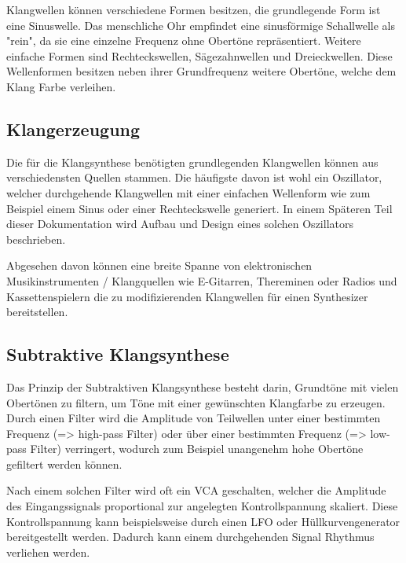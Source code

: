 Klangwellen können verschiedene Formen besitzen, die grundlegende Form ist eine Sinuswelle. Das menschliche Ohr empfindet eine sinusförmige Schallwelle als "rein", da sie eine einzelne Frequenz ohne Obertöne repräsentiert. Weitere einfache Formen sind Rechteckswellen, Sägezahnwellen und Dreieckwellen. Diese Wellenformen besitzen neben ihrer Grundfrequenz weitere Obertöne, welche dem Klang Farbe verleihen.

\subsection{Klangerzeugung}
\label{sec:org03d2400}
Die für die Klangsynthese benötigten grundlegenden Klangwellen können aus verschiedensten Quellen stammen. Die häufigste davon ist wohl ein Oszillator, welcher durchgehende Klangwellen mit einer einfachen Wellenform wie zum Beispiel einem Sinus oder einer Rechteckswelle generiert. In einem Späteren Teil dieser Dokumentation wird Aufbau und Design eines solchen Oszillators beschrieben.

Abgesehen davon können eine breite Spanne von elektronischen Musikinstrumenten / Klangquellen wie E-Gitarren, Thereminen oder Radios und Kassettenspielern die zu modifizierenden Klangwellen für einen Synthesizer bereitstellen.

\subsection{Subtraktive Klangsynthese}
\label{sec:org84d5f29}
Das Prinzip der Subtraktiven Klangsynthese besteht darin, Grundtöne mit vielen Obertönen zu filtern, um Töne mit einer gewünschten Klangfarbe zu erzeugen. Durch einen Filter wird die Amplitude von Teilwellen unter einer bestimmten Frequenz (=> high-pass Filter) oder über einer bestimmten Frequenz (=> low-pass Filter) verringert, wodurch zum Beispiel unangenehm hohe Obertöne gefiltert werden können.

Nach einem solchen Filter wird oft ein VCA geschalten, welcher die Amplitude des Eingangssignals proportional zur angelegten Kontrollspannung skaliert. Diese Kontrollspannung kann beispielsweise durch einen LFO oder Hüllkurvengenerator bereitgestellt werden. Dadurch kann einem durchgehenden Signal Rhythmus verliehen werden.

